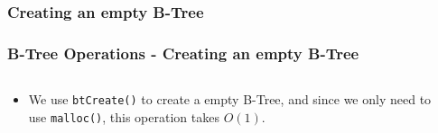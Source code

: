 \documentclass{beamer}
\begin{document}
\begin{frame}
    \subsubsection{Creating an empty B-Tree}
    \frametitle{B-Tree Operations - Creating an empty B-Tree}
    \begin{columns}
        \begin{column}{\textlecolumn}
            \begin{block}{}
                \begin{itemize}
                    \item We use \lstinline|btCreate()| to create a empty B-Tree, and since we only need to use \lstinline|malloc()|, this operation takes \(O(1)\).
                \end{itemize}
            \end{block}
            \begin{block}
                \btreeCreateEmpty
            \end{block}
        \end{column}
        \begin{column}{\textricolumn}
        \end{column}
    \end{columns}
\end{frame}
\end{document}
